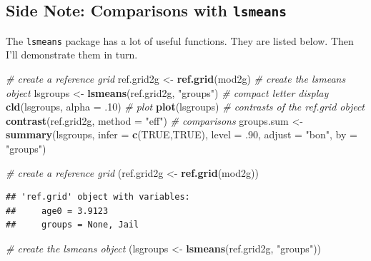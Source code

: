 \documentclass[]{article}
\newenvironment{Shaded}{\begin{snugshade}}{\end{snugshade}}
\newcommand{\KeywordTok}[1]{\textcolor[rgb]{0.13,0.29,0.53}{\textbf{#1}}}
\newcommand{\DataTypeTok}[1]{\textcolor[rgb]{0.13,0.29,0.53}{#1}}
\newcommand{\DecValTok}[1]{\textcolor[rgb]{0.00,0.00,0.81}{#1}}
\newcommand{\StringTok}[1]{\textcolor[rgb]{0.31,0.60,0.02}{#1}}
\newcommand{\CommentTok}[1]{\textcolor[rgb]{0.56,0.35,0.01}{\textit{#1}}}
\newcommand{\OtherTok}[1]{\textcolor[rgb]{0.56,0.35,0.01}{#1}}
\newcommand{\NormalTok}[1]{#1}
\begin{document}
\subsection{\texorpdfstring{Side Note: Comparisons with
\texttt{lsmeans}}{Side Note: Comparisons with lsmeans}}\label{side-note-comparisons-with-lsmeans}

The \texttt{lsmeans} package has a lot of useful functions. They are
listed below. Then I'll demonstrate them in turn.\\
\small

\begin{Shaded}
\begin{Highlighting}[]
\CommentTok{# create a reference grid}
\NormalTok{ref.grid2g <-}\StringTok{ }\KeywordTok{ref.grid}\NormalTok{(mod2g)}
\CommentTok{# create the lsmeans object}
\NormalTok{lsgroups   <-}\StringTok{ }\KeywordTok{lsmeans}\NormalTok{(ref.grid2g, }\StringTok{"groups"}\NormalTok{)}
\CommentTok{# compact letter display}
\KeywordTok{cld}\NormalTok{(lsgroups, }\DataTypeTok{alpha =}\NormalTok{ .}\DecValTok{10}\NormalTok{)}
\CommentTok{# plot}
\KeywordTok{plot}\NormalTok{(lsgroups)}
\CommentTok{# contrasts of the ref.grid object}
\KeywordTok{contrast}\NormalTok{(ref.grid2g, }\DataTypeTok{method =} \StringTok{"eff"}\NormalTok{)}
\CommentTok{# comparisons}
\NormalTok{groups.sum <-}\StringTok{ }\KeywordTok{summary}\NormalTok{(lsgroups, }\DataTypeTok{infer =} \KeywordTok{c}\NormalTok{(}\OtherTok{TRUE}\NormalTok{,}\OtherTok{TRUE}\NormalTok{), }
                      \DataTypeTok{level =}\NormalTok{ .}\DecValTok{90}\NormalTok{, }\DataTypeTok{adjust =} \StringTok{"bon"}\NormalTok{, }\DataTypeTok{by =} \StringTok{"groups"}\NormalTok{)}
\end{Highlighting}
\end{Shaded}

\begin{Shaded}
\begin{Highlighting}[]
\CommentTok{# create a reference grid}
\NormalTok{(ref.grid2g <-}\StringTok{ }\KeywordTok{ref.grid}\NormalTok{(mod2g))}
\end{Highlighting}
\end{Shaded}

\begin{verbatim}
## 'ref.grid' object with variables:
##     age0 = 3.9123
##     groups = None, Jail
\end{verbatim}

\begin{Shaded}
\begin{Highlighting}[]
\CommentTok{# create the lsmeans object}
\NormalTok{(lsgroups   <-}\StringTok{ }\KeywordTok{lsmeans}\NormalTok{(ref.grid2g, }\StringTok{"groups"}\NormalTok{))}
\end{Highlighting}
\end{Shaded}
\end{document}
